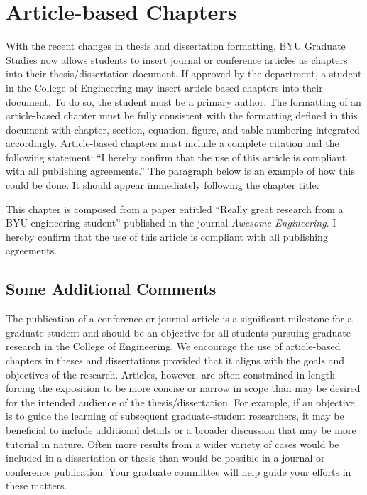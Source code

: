 \chapter{Article-based Chapters}
\label{ch:article_based_chap}

With the recent changes in thesis and dissertation formatting\cite{bugref1}, BYU Graduate Studies now allows students to insert journal or conference articles as chapters into their thesis/dissertation document. If approved by the department, a student in the College of Engineering may insert article-based chapters into their document. To do so, the student must be a primary author. The formatting of an article-based chapter must be fully consistent with the formatting defined in this document with chapter, section, equation, figure, and table numbering integrated accordingly. Article-based chapters must include a complete citation and the following statement: ``I hereby confirm that the use of this article is compliant with all publishing agreements.'' The paragraph below is an example of how this could be done. It should appear immediately following the chapter title.

\vspace{0.1in}
\noindent This chapter is composed from a paper entitled ``Really great research from a BYU engineering student'' published in the journal {\itshape Awesome Engineering}. I hereby confirm that the use of this article is compliant with all publishing agreements.



\section{Some Additional Comments}
The publication of a conference or journal article is a significant milestone for a graduate  student and should be an objective for all students pursuing graduate research in the College of Engineering. We encourage the use of article-based chapters in theses and dissertations provided that it aligns with the goals and objectives of the research. Articles, however, are often constrained in length forcing the exposition to be more concise or narrow in scope than may be desired for the intended audience of the thesis/dissertation. For example, if an objective is to guide the learning of subsequent graduate-student researchers, it may be beneficial to include additional details or a broader discussion that may be more tutorial in nature. Often more results from a wider variety of cases would be included in a dissertation or thesis than would be possible in a journal or conference publication. Your graduate committee will help guide your efforts in these matters.
